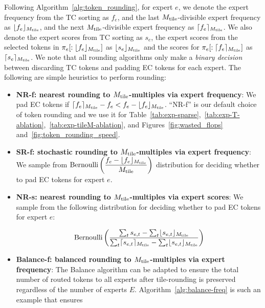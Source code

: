 Following Algorithm~\ref{alg:token_rounding}, for expert $e$, we denote the expert frequency from the TC sorting as $f_e$, and the last $M_\mathrm{tile}$-divisible expert frequency as $\lfloor f_e\rfloor_{M_\mathrm{tile}}$, and the next $M_\mathrm{tile}$-divisible expert frequency as $\lceil f_e\rceil_{M_\mathrm{tile}}$. We also denote the expert scores from TC sorting as $s_e$, the expert scores from the selected tokens in $\pi_e[:\lfloor f_e\rfloor_{M_\mathrm{tile}}]$ as $\lfloor s_e\rfloor_{M_\mathrm{tile}}$ and the scores for $\pi_e[:\lceil f_e\rceil_{M_\mathrm{tile}}]$ as $\lceil s_e\rceil_{M_\mathrm{tile}}$. We note that all rounding algorithms only make a \textit{binary decision} between discarding TC tokens and padding EC tokens for each expert. The following are simple heuristics to perform rounding:



\begin{itemize}
    \item \textbf{NR-f: nearest rounding to $M_\mathrm{tile}$-multiples via expert frequency}: We pad EC tokens if $\lceil f_e\rceil_{M_\mathrm{tile}} - f_e < f_e - \lfloor f_e\rfloor_{M_\mathrm{tile}}$. ``NR-f'' is our default choice of token rounding and we use it for Table~\ref{tab:exp-sparse},~\ref{tab:exp-T-ablation},~\ref{tab:exp-tileM-ablation}, and Figures~\ref{fig:wasted_flops} and~\ref{fig:token_rounding_speed}.

    \item \textbf{SR-f: stochastic rounding to $M_\mathrm{tile}$-multiples via expert frequency}: We sample from $\mathrm{Bernoulli}\left(\dfrac{f_e-\lfloor f_e\rfloor_{M_\mathrm{tile}}}{M_\mathrm{tile}}\right)$ distribution for deciding whether to pad EC tokens for expert $e$.

    \item \textbf{NR-s: nearest rounding to $M_\mathrm{tile}$-multiples via expert scores}: We sample from the following distribution for deciding whether to pad EC tokens for expert $e$:

    \vspace{-1.5em}
    \begin{equation}
        \mathrm{Bernoulli}\left(\dfrac{\sum_t s_{e,t}- \sum_t \lfloor s_{e,t}\rfloor_{M_\mathrm{tile}}}{\sum_t \lceil s_{e,t}\rceil_{M_\mathrm{tile}} - \sum_t \lfloor s_{e,t}\rfloor_{M_\mathrm{tile}}}\right)
    \end{equation}

    \item \textbf{Balance-f: balanced rounding to $M_\mathrm{tile}$-multiples via expert frequency}: The Balance algorithm \citep{dwivedi2024kernel,lu2022grab,cooper2023coordinating} can be adapted to ensure the total number of routed tokens to all experts after tile-rounding is preserved regardless of the number of experts $E$. Algorithm~\ref{alg:balance-freq} is such an example that ensures


\end{itemize}
